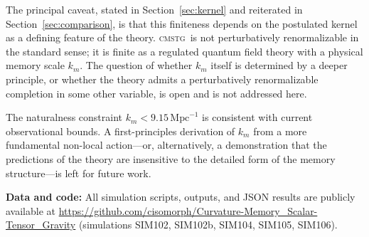 \documentclass[12pt,a4paper]{article}
\newcommand{\CMSTG}{\textsc{cmstg}}
\newcommand{\km}{{k_m}}
\begin{document}
The principal caveat, stated in Section~\ref{sec:kernel} and reiterated in
Section~\ref{sec:comparison}, is that this finiteness depends on the postulated
kernel as a defining feature of the theory. \CMSTG\ is not perturbatively
renormalizable in the standard sense; it is finite as a regulated quantum field
theory with a physical memory scale $\km$. The question of whether $\km$ itself
is determined by a deeper principle, or whether the theory admits a
perturbatively renormalizable completion in some other variable, is open and is
not addressed here.

The naturalness constraint $\km < 9.15\,\mathrm{Mpc}^{-1}$ is consistent with
current observational bounds. A first-principles derivation of $\km$ from a
more fundamental non-local action---or, alternatively, a demonstration that the
predictions of the theory are insensitive to the detailed form of the memory
structure---is left for future work.

\bigskip
\noindent\textbf{Data and code:}
All simulation scripts, outputs, and JSON results are publicly available at
\url{https://github.com/cisomorph/Curvature-Memory_Scalar-Tensor_Gravity}
(simulations SIM102, SIM102b, SIM104, SIM105, SIM106).
\end{document}
